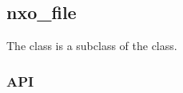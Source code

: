 %
%
%
%
%              

\subsection{nxo\_file}
\label{nxo_file}

The  class is a subclass of the  class.

\subsubsection{API}

